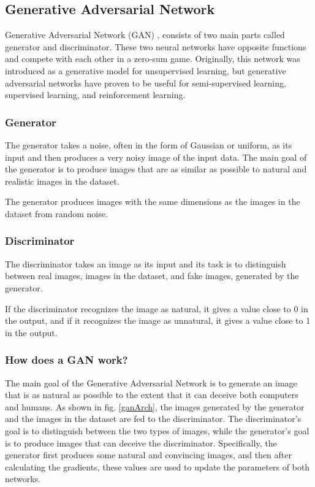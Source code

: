 \documentclass[lettersize,journal]{IEEEtran}
\begin{document}
\subsection*{Generative Adversarial Network}
Generative Adversarial Network (GAN) \cite{Goodfellow2014GenerativeAN}, consists of two main parts called generator and discriminator. These two neural networks have opposite functions and compete with each other in a zero-sum game.
Originally, this network was introduced as a generative model for unsupervised learning, but generative adversarial networks have proven to be useful for semi-supervised learning, supervised learning, and reinforcement learning.
\subsubsection*{Generator}
The generator takes a noise, often in the form of Gaussian or uniform, as its input and then produces a very noisy image of the input data. The main goal of the generator is to produce images that are as similar as possible to natural and realistic images in the dataset.

The generator produces images with the same dimensions as the images in the dataset from random noise.

\subsubsection*{Discriminator}
The discriminator takes an image as its input and its task is to distinguish between real images, images in the dataset, and fake images, generated by the generator.

If the discriminator recognizes the image as natural, it gives a value close to 0 in the output, and if it recognizes the image as unnatural, it gives a value close to 1 in the output.

\subsubsection*{How does a GAN work?}
The main goal of the Generative Adversarial Network is to generate an image that is as natural as possible to the extent that it can deceive both computers and humans. As shown in fig. \ref{ganArch}, the images generated by the generator and the images in the dataset are fed to the discriminator. The discriminator's goal is to distinguish between the two types of images, while the generator's goal is to produce images that can deceive the discriminator. Specifically, the generator first produces some natural and convincing images, and then after calculating the gradients, these values are used to update the parameters of both networks.
\end{document}
